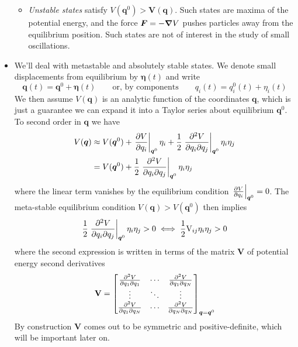 \documentclass[11pt, a4paper]{article}
\newcommand{\eqtext}[1]{\qquad \text{#1} \qquad}
\newcommand{\mat}[1]{\mathbf{#1}} %
\begin{document}
\begin{itemize}
\begin{itemize}
		\item \textit{Unstable states} satisfy $ V(\bm{q}^{0}) > \bm{V}(\bm{q}) $. Such states are maxima of the potential energy, and the force $ \bm{F} = - \grad V $ pushes particles away from the equilibrium position. Such states are not of interest in the study of small oscillations.
	\end{itemize}
	
	
	\item We'll deal with metastable and absolutely stable states. We denote small displacements from equilibrium by $ \bm{\eta}(t) $ and write
	\begin{equation*}
		\bm{q}(t) = \bm{q}^{0} + \bm{\eta}(t) \eqtext{or, by components} q_{i}(t) = q_{i}^{0}(t) + \eta_{i}(t)
	\end{equation*}
	We then assume $ V(\bm{q}) $ is an analytic function of the coordinates $ \bm{q} $, which is just a guarantee we can expand it into a Taylor series about equilibrium $ \bm{q}^{0} $. To second order in $ \bm{q} $ we have
	\begin{align*}
		V(\bm{q}) &\approx V(\bm{q}^{0}) + \eval{\pdv{V}{q_{i}}}_{\bm{q}^{0}} \eta_{i} + \frac{1}{2}\eval{\pdv{V}{q_{i}}{q_{j}}}_{\bm{q}^{0}}\eta_{i}\eta_{j}\\
		&=V(\bm{q}^{0}) + \frac{1}{2}\eval{\pdv{V}{q_{i}}{q_{j}}}_{\bm{q}^{0}}\eta_{i}\eta_{j}
	\end{align*}
	where the linear term vanishes by the equilibrium condition $\eval{\pdv{V}{q_{i}}}_{\bm{q}^{0}} = 0 $. The meta-stable equilibrium condition $ V(\bm{q}) > V(\bm{q}^{0}) $ then implies
	\begin{equation*}
		\frac{1}{2}\eval{\pdv{V}{q_{i}}{q_{j}}}_{\bm{q}^{0}}\eta_{i}\eta_{j} > 0 \iff \frac{1}{2} \mathrm{V}_{ij}\eta_{i}\eta_{j} > 0
	\end{equation*}
	where the second expression is written in terms of the matrix $ \mat{V} $ of potential energy second derivatives
	\begin{equation*}
		\mat{V} =
		\begin{bmatrix}
			\pdv{V}{q_1}{q_{1}} & \cdots & \pdv{V}{q_{1}}{q_N}\\
			\vdots & \ddots & \vdots\\
			\pdv{V}{q_1}{q_{N}} & \cdots & \pdv{V}{q_N}{q_{N}}\\
		\end{bmatrix}_{\bm{q} = \bm{q}^{0}}
	\end{equation*}
	By construction $ \mat{V} $ comes out to be symmetric and positive-definite, which will be important later on.
	

\end{itemize}
\end{document}
